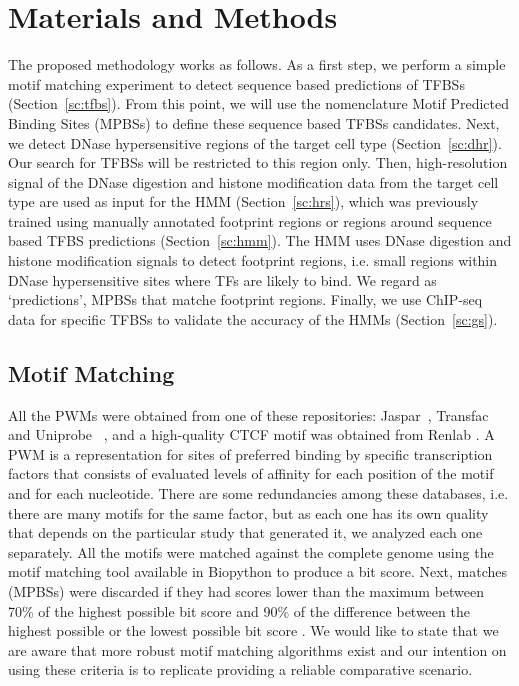 \documentclass[runningheads,a4paper]{llncs}
\begin{document}
\section{Materials and Methods}

The proposed methodology works as follows. As a first step, we perform
a simple motif matching experiment to detect sequence based
predictions of TFBSs (Section~\ref{sc:tfbs}). From this point, we 
will use the nomenclature Motif Predicted Binding Sites (MPBSs) to define 
these sequence based TFBSs candidates. Next, we
detect DNase hypersensitive regions of the target cell type
(Section~\ref{sc:dhr}). Our search for TFBSs will be restricted to this region only.  
Then, high-resolution signal of the DNase digestion and
histone modification data from the target cell type are used as input
for the HMM (Section~\ref{sc:hrs}), which was previously trained using
manually annotated footprint regions or regions around sequence based
TFBS predictions (Section~\ref{sc:hmm}). The HMM uses DNase digestion
and histone modification signals to detect footprint regions, 
i.e. small regions within DNase hypersensitive sites
where TFs are likely to bind. We regard as `predictions', MPBSs
that matche footprint regions. Finally, we use ChIP-seq data for 
specific TFBSs to validate the accuracy of the HMMs (Section~\ref{sc:gs}).

\subsection{Motif Matching\label{sc:tfbs}}

All the PWMs were obtained from one of these repositories:
Jaspar~\cite{byrne2008}, Transfac~\cite{matys2006} and
Uniprobe~\cite{newburger2009}
, and a high-quality CTCF motif was
obtained from Renlab \cite{kim2007}. A PWM is a representation for
sites of preferred binding by specific transcription factors that
consists of evaluated levels of affinity for each position of the
motif and for each nucleotide. There are some redundancies among
these databases, i.e. there are many motifs for the same factor, but
as each one has its own quality that depends on the particular study
that generated it, we analyzed each one separately. All the motifs
were matched against the complete genome using the motif matching tool
available in Biopython \cite{cock2009} to produce a bit score. Next,
matches (MPBSs) were discarded if they had scores lower than the maximum
between 70\% of the highest possible bit score and 90\% of the
difference between the highest possible or the lowest possible bit
score \cite{boyle2011}. We would like to state that we are aware that
more robust motif matching algorithms exist and our intention on using
these criteria is to replicate \cite{boyle2011} providing a reliable 
comparative scenario.
\end{document}
